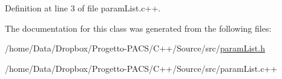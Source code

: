 Definition at line 3 of file param\-List.\-c++.



The documentation for this class was generated from the following files\-:\begin{DoxyCompactItemize}
\item 
/home/\-Data/\-Dropbox/\-Progetto-\/\-P\-A\-C\-S/\-C++/\-Source/src/\hyperlink{paramList_8h}{param\-List.\-h}\item 
/home/\-Data/\-Dropbox/\-Progetto-\/\-P\-A\-C\-S/\-C++/\-Source/src/param\-List.\-c++\end{DoxyCompactItemize}
